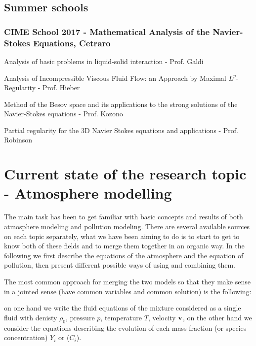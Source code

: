 \documentclass{article}
\begin{document}
\subsection{Summer schools}

\subsubsection{CIME School 2017  - Mathematical Analysis of the Navier-Stokes Equations, Cetraro}

\begin{outline}[enumerate]

\1 Analysis of basic problems in liquid-solid interaction - Prof. Galdi

\1 Analysis of Incompressible Viscous Fluid Flow: an Approach by Maximal $L^p$-Regularity - Prof. Hieber

\1 Method of the Besov space and its applications to the strong solutions of the Navier-Stokes equations - Prof. Kozono

\1 Partial regularity for the 3D Navier Stokes equations and applications - Prof. Robinson

\end{outline}

\section{Current state of the research topic - Atmosphere modelling}

The main task has been to get familiar with basic concepts and results of both atmosphere modeling and pollution modeling. There are several available sources on each topic separately, what we have been aiming to do is to start to get to know both of these fields and to merge them together in an organic way. In the following we first describe the equations of the atmosphere and the equation of pollution, then present different possible ways of using and combining them.

The most common approach for merging the two models so that they make sense in a jointed sense (have common variables and common solution) is the following:

\begin{outline}[enumerate]

\1 on one hand we write the fluid equations of the mixture considered as a single fluid with denisty $\rho_0$, pressure $p$, temperature $T$, velocity $\bold{v}$,
\1 on the other hand we consider the equations describing the evolution of each mass fraction (or species concentration) $Y_i$ or ($C_i$). 

\end{outline}
\end{document}
